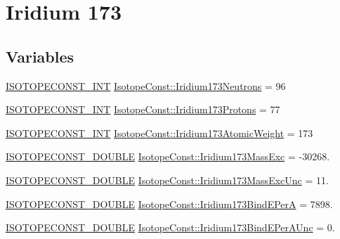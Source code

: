 \hypertarget{group___isotope_const-_iridium-_ir173}{}\section{Iridium 173}
\label{group___isotope_const-_iridium-_ir173}
\subsection*{Variables}
\begin{DoxyCompactItemize}
\item 
\mbox{\hyperlink{group___isotope_const-_macros_ga5f18360b3e99483a35c32d789e62621c}{I\+S\+O\+T\+O\+P\+E\+C\+O\+N\+S\+T\+\_\+\+I\+NT}} \mbox{\hyperlink{group___isotope_const-_iridium-_ir173_gabfa7392a4ee51fa4297cb185a6b11319}{Isotope\+Const\+::\+Iridium173\+Neutrons}} = 96
\item 
\mbox{\hyperlink{group___isotope_const-_macros_ga5f18360b3e99483a35c32d789e62621c}{I\+S\+O\+T\+O\+P\+E\+C\+O\+N\+S\+T\+\_\+\+I\+NT}} \mbox{\hyperlink{group___isotope_const-_iridium-_ir173_gab588789ccf7366695c6838b060069ec0}{Isotope\+Const\+::\+Iridium173\+Protons}} = 77
\item 
\mbox{\hyperlink{group___isotope_const-_macros_ga5f18360b3e99483a35c32d789e62621c}{I\+S\+O\+T\+O\+P\+E\+C\+O\+N\+S\+T\+\_\+\+I\+NT}} \mbox{\hyperlink{group___isotope_const-_iridium-_ir173_ga10b11c1f5ad1e31edaa41f326c863042}{Isotope\+Const\+::\+Iridium173\+Atomic\+Weight}} = 173
\item 
\mbox{\hyperlink{group___isotope_const-_macros_ga8f45a7272ce02c0b4c65c44636ed719a}{I\+S\+O\+T\+O\+P\+E\+C\+O\+N\+S\+T\+\_\+\+D\+O\+U\+B\+LE}} \mbox{\hyperlink{group___isotope_const-_iridium-_ir173_ga78ba3394bfba60347da0589b70e08614}{Isotope\+Const\+::\+Iridium173\+Mass\+Exc}} = -\/30268.
\item 
\mbox{\hyperlink{group___isotope_const-_macros_ga8f45a7272ce02c0b4c65c44636ed719a}{I\+S\+O\+T\+O\+P\+E\+C\+O\+N\+S\+T\+\_\+\+D\+O\+U\+B\+LE}} \mbox{\hyperlink{group___isotope_const-_iridium-_ir173_ga81dfdcbd789a16d006ad17b91b3f8b05}{Isotope\+Const\+::\+Iridium173\+Mass\+Exc\+Unc}} = 11.
\item 
\mbox{\hyperlink{group___isotope_const-_macros_ga8f45a7272ce02c0b4c65c44636ed719a}{I\+S\+O\+T\+O\+P\+E\+C\+O\+N\+S\+T\+\_\+\+D\+O\+U\+B\+LE}} \mbox{\hyperlink{group___isotope_const-_iridium-_ir173_ga61d52d6d7807ba8937ded31fbdf045fe}{Isotope\+Const\+::\+Iridium173\+Bind\+E\+PerA}} = 7898.
\item 
\mbox{\hyperlink{group___isotope_const-_macros_ga8f45a7272ce02c0b4c65c44636ed719a}{I\+S\+O\+T\+O\+P\+E\+C\+O\+N\+S\+T\+\_\+\+D\+O\+U\+B\+LE}} \mbox{\hyperlink{group___isotope_const-_iridium-_ir173_ga2bfd8b60bb75eabc43f5b194160826e8}{Isotope\+Const\+::\+Iridium173\+Bind\+E\+Per\+A\+Unc}} = 0.

\end{DoxyCompactItemize}
